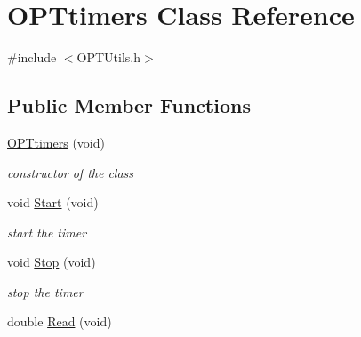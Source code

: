 \hypertarget{class_o_p_ttypes__di__unipi__it_1_1_o_p_ttimers}{}\section{O\+P\+Ttimers Class Reference}
\label{class_o_p_ttypes__di__unipi__it_1_1_o_p_ttimers}


{\ttfamily \#include $<$O\+P\+T\+Utils.\+h$>$}

\subsection*{Public Member Functions}
\begin{DoxyCompactItemize}
\item 
\mbox{\label{class_o_p_ttypes__di__unipi__it_1_1_o_p_ttimers_a19b3b7914f0c0265fe5b50b73f2600e3}} 
\mbox{\hyperlink{class_o_p_ttypes__di__unipi__it_1_1_o_p_ttimers_a19b3b7914f0c0265fe5b50b73f2600e3}{O\+P\+Ttimers}} (void)
\begin{DoxyCompactList}\small\item\em constructor of the class \end{DoxyCompactList}\item 
\mbox{\label{class_o_p_ttypes__di__unipi__it_1_1_o_p_ttimers_a983601e8aa8b271fc7a583c1c4eb34a6}} 
void \mbox{\hyperlink{class_o_p_ttypes__di__unipi__it_1_1_o_p_ttimers_a983601e8aa8b271fc7a583c1c4eb34a6}{Start}} (void)
\begin{DoxyCompactList}\small\item\em start the timer \end{DoxyCompactList}\item 
\mbox{\label{class_o_p_ttypes__di__unipi__it_1_1_o_p_ttimers_a76c658dc5f4332e4b034419dca518c1c}} 
void \mbox{\hyperlink{class_o_p_ttypes__di__unipi__it_1_1_o_p_ttimers_a76c658dc5f4332e4b034419dca518c1c}{Stop}} (void)
\begin{DoxyCompactList}\small\item\em stop the timer \end{DoxyCompactList}\item 
double \mbox{\hyperlink{class_o_p_ttypes__di__unipi__it_1_1_o_p_ttimers_af0ce31a284ab2dedf9cede10bc3ccce0}{Read}} (void)
\item 

\end{DoxyCompactItemize}
